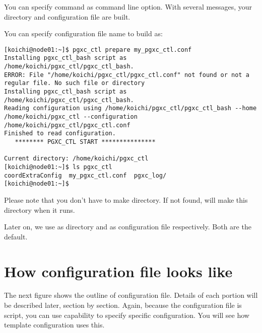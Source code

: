   You can specify  command as  command line option.
  With several messages, your  directory and configuration file are built.
  
  You can specify configuration file name to build as:
  
  \begin{lstlisting}[frame=single]
[koichi@node01:~]$ pgxc_ctl prepare my_pgxc_ctl.conf
Installing pgxc_ctl_bash script as /home/koichi/pgxc_ctl/pgxc_ctl_bash.
ERROR: File "/home/koichi/pgxc_ctl/pgxc_ctl.conf" not found or not a regular file. No such file or directory
Installing pgxc_ctl_bash script as /home/koichi/pgxc_ctl/pgxc_ctl_bash.
Reading configuration using /home/koichi/pgxc_ctl/pgxc_ctl_bash --home /home/koichi/pgxc_ctl --configuration /home/koichi/pgxc_ctl/pgxc_ctl.conf
Finished to read configuration.
   ******** PGXC_CTL START ***************

Current directory: /home/koichi/pgxc_ctl
[koichi@node01:~]$ ls pgxc_ctl
coordExtraConfig  my_pgxc_ctl.conf  pgxc_log/
[koichi@node01:~]$ 
  \end{lstlisting}
  
  Please note that you don't have to make  directory.
  If not found,  will make this directory when it runs.
  
  Later on, we use  as  directory and 
  as configuration file respectively.
  Both are the default.



\section{How configuration file looks like}

  The next figure shows the outline of  configuration file.
  Details of each portion will be described later, section by section.
  Again, because the configuration file is  script, you can use  capability to specify specific configuration.
  You will see how template configuration uses this.
  
